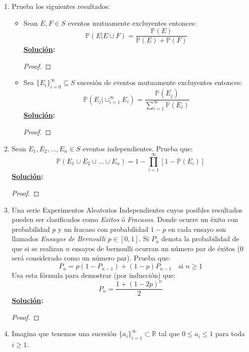 \documentclass[11pt,letterpaper]{report}
\newcommand{\R}{\mathbb{R}}
\newcommand{\Pro}{\mathds{P}}
\newcommand{\sol}{\textbf{\underline{Solución}: }} %
\begin{document}
\begin{enumerate}

\item Prueba los siguientes resultados:
\begin{itemize}
    \item Sean $E, F \in S$ eventos mutuamente excluyentes entonces:
    \[
        \Pro(E|E \cup F) = \frac{\Pro(E)}{\Pro(E) + \Pro(F)}
    \]
    \sol \begin{proof}
        
    \end{proof}
    
    \item Sea $\{ E_i \}_{i=0}^\infty \subseteq S$ sucesión de eventos mutuamente excluyentes
    entonces:
    \[
        \Pro(E_j | \cup_{i=1}^{\infty} E_i) = \frac{\Pro(E_j)}
            {\sum_{i=1}^{\infty} \Pro(E_i)}
    \]
    \sol \begin{proof}
        
    \end{proof}
\end{itemize}

\item Sean $E_1, E_2, \ldots , E_n \in S$ eventos independientes. Prueba que:
\[
    \Pro(E_1 \cup E_2 \cup \ldots \cup E_n) = 1 - \prod_{i=1}^{\infty} [1 - \Pro(E_i)]
\]
\sol \begin{proof}
    
\end{proof}

\item Una serie Experimentos Aleatorios Independientes cuyos posibles resultados pueden ser
clasificados como \emph{Exitos} ó \emph{Fracasos}. Donde ocurre un éxito con probabilidad $p$ y un
fracaso con probabilidad $1-p$ en cada ensayo son llamados \emph{Ensayos de Bernoulli}
$p \in [0, 1]$. Si $P_n$ denota la probabilidad de que si se realizan $n$ ensayos de bernoulli
ocurran un número par de éxitos (0 será considerado como un número par). Prueba que:
\[
    P_n = p(1 - P_{n-1})+(1-p)P_{n-1} \quad \text{si } n \geq 1
\]
Usa esta fórmula para demostrar (por inducción) que:
\[
    P_n = \frac{1+ (1-2p)^n}{2}
\]
\sol \begin{proof}
    
\end{proof}

\item Imagina que tenemos una sucesión $\{ a_i \}_{i=1}^{\infty} \subset \R$ tal que
$0 \leq a_i \leq 1$ para toda $i \geq 1$.


\end{enumerate}
\end{document}
